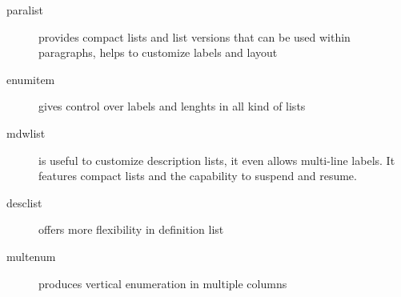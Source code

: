 \documentclass{article}
\begin{document}
\begin{description}
  \item[paralist] provides compact lists and list versions that
    can be used within paragraphs, helps to customize labels and layout
  \item[enumitem] gives control over labels and lenghts in all kind of lists
  \item[mdwlist] is useful to customize description lists, it even allows
    multi-line labels. It features compact lists and the capability
    to suspend and resume.
  \item[desclist] offers more flexibility in definition list
  \item[multenum] produces vertical enumeration in multiple columns
\end{description}
\end{document}
